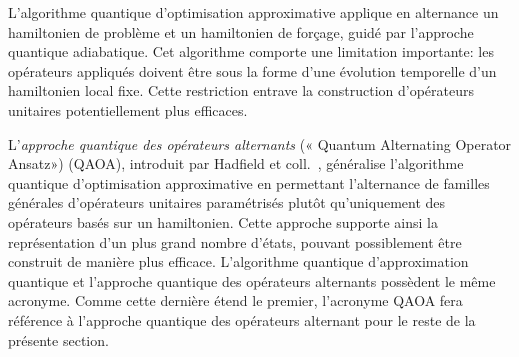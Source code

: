 L'algorithme quantique d'optimisation approximative applique en alternance un hamiltonien de problème et un hamiltonien de forçage, guidé par l'approche quantique adiabatique. Cet algorithme comporte une limitation importante: les opérateurs appliqués doivent être sous la forme d'une évolution temporelle d'un hamiltonien local fixe. Cette restriction entrave la construction d'opérateurs unitaires potentiellement plus efficaces.

L'\textit{approche quantique des opérateurs alternants} (« Quantum Alternating Operator Ansatz») (QAOA), introduit par Hadfield et coll.~\cite{hadfieldQuantumApproximateOptimization2019}, généralise l'algorithme quantique d'optimisation approximative en permettant l'alternance de familles générales d'opérateurs unitaires paramétrisés plutôt qu'uniquement des opérateurs basés sur un hamiltonien. Cette approche supporte ainsi la représentation d'un plus grand nombre d'états, pouvant possiblement être construit de manière plus efficace. L'algorithme quantique d'approximation quantique et l'approche quantique des opérateurs alternants possèdent le même acronyme. Comme cette dernière étend le premier, l'acronyme QAOA fera référence à l'approche quantique des opérateurs alternant pour le reste de la présente section.


